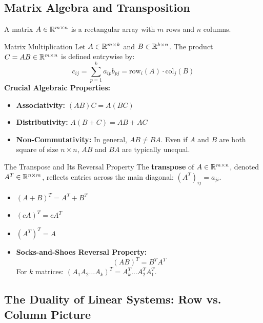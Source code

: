 \subsection{Matrix Algebra and Transposition}

A matrix $A \in \mathbb{R}^{m \times n}$ is a rectangular array with $m$ rows and $n$ columns.

\begin{definitionbox}{Matrix Multiplication}
Let $A \in \mathbb{R}^{m \times k}$ and $B \in \mathbb{R}^{k \times n}$. The product $C = AB \in \mathbb{R}^{m \times n}$ is defined entrywise by:
\begin{equation}
c_{ij} = \sum_{p=1}^k a_{ip} b_{pj} = \text{row}_i(A) \cdot \text{col}_j(B)
\end{equation}
\textbf{Crucial Algebraic Properties:}
\begin{itemize}
    \item \textbf{Associativity:} $(AB)C = A(BC)$
    \item \textbf{Distributivity:} $A(B + C) = AB + AC$
    \item \textbf{Non-Commutativity:} In general, $AB \neq BA$. Even if $A$ and $B$ are both square of size $n \times n$, $AB$ and $BA$ are typically unequal.
\end{itemize}
\end{definitionbox}

\begin{theorembox}{The Transpose and Its Reversal Property}
The \textbf{transpose} of $A \in \mathbb{R}^{m \times n}$, denoted $A^T \in \mathbb{R}^{n \times m}$, reflects entries across the main diagonal: $(A^T)_{ij} = a_{ji}$.
\begin{itemize}
    \item $(A + B)^T = A^T + B^T$
    \item $(cA)^T = c A^T$
    \item $(A^T)^T = A$
    \item \textbf{Socks-and-Shoes Reversal Property:}
    \begin{equation}
    (AB)^T = B^T A^T
    \end{equation}
    For $k$ matrices: $(A_1 A_2 \dots A_k)^T = A_k^T \dots A_2^T A_1^T$.
\end{itemize}
\end{theorembox}

\subsection{The Duality of Linear Systems: Row vs. Column Picture}

